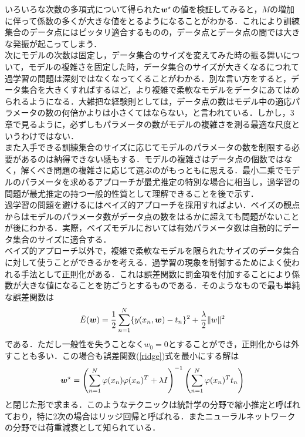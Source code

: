 \documentclass[a4j,11pt]{jsarticle}
\newcommand{\bw}{\mbox{\boldmath {$w$}}}
\numberwithin{equation}{section}
\begin{document}
いろいろな次数の多項式について得られた$\bw^{\star}$の値を検証してみると，$M$の増加に伴って係数の多くが大きな値をとるようになることがわかる．これにより訓練集合のデータ点にはピッタリ適合するものの，データ点とデータ点の間では大きな発振が起こってしまう．\\

次にモデルの次数は固定し，データ集合のサイズを変えてみた時の振る舞いについて，モデルの複雑さを固定した時，データ集合のサイズが大きくなるにつれて過学習の問題は深刻ではなくなってくることがわかる．別な言い方をすると，データ集合を大きくすればするほど，より複雑で柔軟なモデルをデータにあてはめられるようになる．大雑把な経験則としては，データ点の数はモデル中の適応パラメータの数の何倍かよりは小さくてはならない，と言われている．しかし，3章で見るように，必ずしもパラメータの数がモデルの複雑さを測る最適な尺度というわけではない．\\

また入手できる訓練集合のサイズに応じてモデルのパラメータの数を制限する必要があるのは納得できない感もする．モデルの複雑さはデータ点の個数ではなく，解くべき問題の複雑さに応じて選ぶのがもっともに思える．最小二乗でモデルのパラメータを求めるアプローチが最尤推定の特別な場合に相当し，過学習の問題が最尤推定の持つ一般的性質として理解できることを後で示す．\\

過学習の問題を避けるにはベイズ的アプローチを採用すればよい．ベイズの観点からはモデルのパラメータ数がデータ点の数をはるかに超えても問題がないことが後にわかる．実際，ベイズモデルにおいては有効パラメータ数は自動的にデータ集合のサイズに適合する．\\

ベイズ的アプローチ以外で，複雑で柔軟なモデルを限られたサイズのデータ集合に対して使うことができるかを考える．過学習の現象を制御するためによく使われる手法として正則化がある．これは誤差関数に罰金項を付加することにより係数が大きな値になることを防ごうとするものである．そのようなもので最も単純な誤差関数は
\begin{align}
  \label{ridge}
\tilde E(\bw) = \frac{1}{2}\sum_{n=1}^N\{y(x_n,\bw)- t_n\}^2+\frac{\lambda}{2}\|w\|^2
\end{align}
である．ただし一般性を失うことなく$w_0 = 0$とすることができ，正則化からは外すことも多い．この場合も誤差関数(\ref*{ridge})式を最小にする解は
\begin{align*}
  \bw^{\star} = \left( \sum_{n=1}^N\varphi(x_n)\varphi(x_n)^T + \lambda I\right)^{-1}\left( \sum_{n=1}^N\varphi(x_n)^T t_n \right)
  \end{align*}
と閉じた形で求まる．このようなテクニックは統計学の分野で縮小推定と呼ばれており，特に2次の場合はリッジ回帰と呼ばれる．またニューラルネットワークの分野では荷重減衰として知られている．\\
\end{document}
